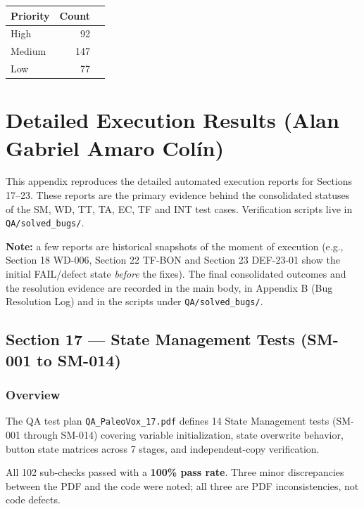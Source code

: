 \documentclass[12pt,a4paper]{article}
\begin{document}
\vspace{0.5cm}
\begin{center}
\begin{tabular}{lrr}
\toprule
\textbf{Priority} & \textbf{Count} \\
\midrule
High   & 92 \\
Medium & 147 \\
Low    & 77 \\
\bottomrule
\end{tabular}
\end{center}

\appendix
\section{Detailed Execution Results (Alan Gabriel Amaro Col\'in)}

This appendix reproduces the detailed automated execution reports for Sections
17--23. These reports are the primary evidence behind the consolidated statuses
of the SM, WD, TT, TA, EC, TF and INT test cases. Verification scripts live in
\texttt{QA/solved\_bugs/}.

\smallskip
\noindent\textbf{Note:} a few reports are historical snapshots of the moment of
execution (e.g., Section 18 WD-006, Section 22 TF-BON and Section 23 DEF-23-01
show the initial FAIL/defect state \emph{before} the fixes). The final
consolidated outcomes and the resolution evidence are recorded in the main body,
in Appendix B (Bug Resolution Log) and in the scripts under
\texttt{QA/solved\_bugs/}.


\subsection{Section 17 --- State Management Tests (SM-001 to SM-014)}

\subsubsection{Overview}

The QA test plan \texttt{QA\_PaleoVox\_17.pdf} defines 14 State Management tests
(SM-001 through SM-014) covering variable initialization, state overwrite behavior,
button state matrices across 7 stages, and independent-copy verification.

All 102 sub-checks passed with a \textbf{100\% pass rate}.
Three minor discrepancies between the PDF and the code were noted;
all three are PDF inconsistencies, not code defects.
\end{document}
